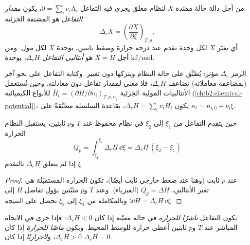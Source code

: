 \begin{definition}\label{def:b2:reaction-enthalpy:reaction-quantity}
من أجل دالة حالة ممتدة $X$ لنظام مغلق يجري فيه التفاعل
$0 = \sum_i\nu_i\mathrm A_i$، يكون \emph{مقدار التفاعل}
هو المشتقة الجزئية
\[
  \Delta_r X = \left(\frac{\partial X}{\partial \xi}\right)_{T,p} ,
\]
أي تغيّر $X$ لكل وحدة تقدم عند درجة حرارة وضغط ثابتين، بوحدة $X$ لكل
مول. ومن أجل $X = H$ هو \emph{أنتالبي التفاعل}
$\Delta_r H$، بوحدة \unit{kJ/mol}.
\end{definition}

\begin{remark}\label{rem:b2:reaction-enthalpy:operator}
الرمز $\Delta_r$ مؤثر: يُطبَّق على حالة النظام ويتركها دون تغيير.
وكتابة التفاعل على نحو آخر (بمضاعفة معاملاته) تضاعف $\Delta_r H$، فلا
معنى لمقدار تفاعل دون معادلته. وحين تُستعمل الأنتالبيات المولية الجزئية
$\bar H_i = (\partial H/\partial n_i)_{T,p,n_j}$ للأنواع الكيميائية
(\cref{ch:b2:chemical-potential})، يكون $\Delta_r H = \sum_i\nu_i\bar H_i$،
بقاعدة السلسلة مطبَّقةً على $n_i = n_{i,0} + \nu_i\xi$.
\end{remark}

\begin{proposition}\label{prop:b2:reaction-enthalpy:qp}
حين يتقدم التفاعل من $\xi_1$ إلى $\xi_2$ في نظام محفوظ عند $T$ و$p$
ثابتين، يستقبل النظام الحرارة
\[
  Q_p = \int_{\xi_1}^{\xi_2}\Delta_r H\,\dd\xi = \Delta_r H\,(\xi_2 - \xi_1)
\]
إذا لم يتعلق $\Delta_r H$ بالتقدم $\xi$.
\end{proposition}

\begin{proof}
عند $p$ ثابت (وهنا عند ضغط خارجي ثابت أيضًا)، تكون الحرارة المستقبَلة
هي تغير الأنتالبي، $Q_p = \Delta H$ (الفيزياء). وعند $T$ و$p$ مثبّتين
يؤول تفاضل $H$ إلى $\dd H = \Delta_r H\,\dd\xi$؛ وبالمكاملة من $\xi_1$
إلى $\xi_2$ نحصل على النتيجة.
\end{proof}

\begin{definition}\label{def:b2:reaction-enthalpy:exothermic}
يكون التفاعل \emph{ناشرًا للحرارة} في حالة معيّنة إذا
كان $\Delta_r H < 0$: فإذا جرى في الاتجاه المباشر عند $T$ و$p$ ثابتين
أعطى حرارة للوسط المحيط. ويكون \emph{ماصًا للحرارة}
إذا كان $\Delta_r H >
0$، و\emph{لاحراريًا} إذا كان $\Delta_r H = 0$.
\end{definition}

